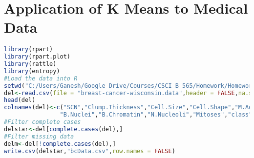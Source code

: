 \documentclass{article}
\begin{document}
\section{Application of K Means to Medical Data}
\begin{lstlisting}[language=R]
library(rpart)
library(rpart.plot)
library(rattle)
library(entropy)
#Load the data into R
setwd("C:/Users/Ganesh/Google Drive/Courses/CSCI B 565/Homework/Homework 2")
del<-read.csv(file = "breast-cancer-wisconsin.data",header = FALSE,na.strings = "?")
head(del)
colnames(del)<-c("SCN","Clump.Thickness","Cell.Size","Cell.Shape","M.Adhesion","SECS",
				"B.Nuclei","B.Chromatin","N.Nucleoli","Mitoses","class")
#Filter complete cases			
delstar<-del[complete.cases(del),]
#Filter missing data
delm<-del[!complete.cases(del),]
write.csv(delstar,"bcData.csv",row.names = FALSE)
\end{lstlisting}
\end{document}
